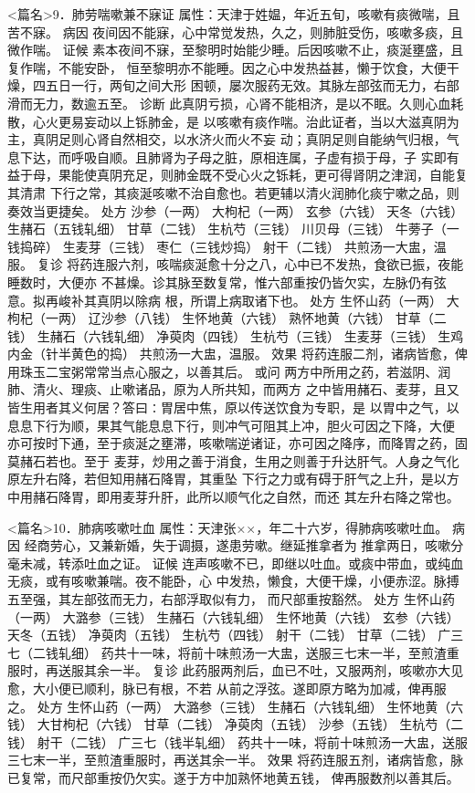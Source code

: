\documentclass[a4paper,12pt,UTF8,twoside]{ctexbook}
\begin{document}
<篇名>9．肺劳喘嗽兼不寐证
属性：天津于姓媪，年近五旬，咳嗽有痰微喘，且苦不寐。 
病因 夜间因不能寐，心中常觉发热，久之，则肺脏受伤，咳嗽多痰，且微作喘。 
证候 素本夜间不寐，至黎明时始能少睡。后因咳嗽不止，痰涎壅盛，且复作喘，不能安卧， 
恒至黎明亦不能睡。因之心中发热益甚，懒于饮食，大便干燥，四五日一行，两旬之间大形 
困顿，屡次服药无效。其脉左部弦而无力，右部滑而无力，数逾五至。 
诊断 此真阴亏损，心肾不能相济，是以不眠。久则心血耗散，心火更易妄动以上铄肺金，是 
以咳嗽有痰作喘。治此证者，当以大滋真阴为主，真阴足则心肾自然相交，以水济火而火不妄 
动；真阴足则自能纳气归根，气息下达，而呼吸自顺。且肺肾为子母之脏，原相连属，子虚有损于母，子 
实即有益于母，果能使真阴充足，则肺金既不受心火之铄耗，更可得肾阴之津润，自能复其清肃 
下行之常，其痰涎咳嗽不治自愈也。若更辅以清火润肺化痰宁嗽之品，则奏效当更捷矣。 
处方 沙参（一两） 大枸杞（一两） 玄参（六钱） 天冬（六钱） 
生赭石（五钱轧细） 甘草（二钱） 生杭芍（三钱） 川贝母（三钱） 牛蒡子（一钱捣碎） 
生麦芽（三钱） 枣仁（三钱炒捣） 射干（二钱） 
共煎汤一大盅，温服。 
复诊 将药连服六剂，咳喘痰涎愈十分之八，心中已不发热，食欲已振，夜能睡数时，大便亦 
不甚燥。诊其脉至数复常，惟六部重按仍皆欠实，左脉仍有弦意。拟再峻补其真阴以除病 
根，所谓上病取诸下也。 
处方 生怀山药（一两） 大枸杞（一两） 辽沙参（八钱） 生怀地黄（六钱） 
熟怀地黄（六钱） 甘草（二钱） 生赭石（六钱轧细） 净萸肉（四钱） 
生杭芍（三钱） 生麦芽（三钱） 生鸡内金（针半黄色的捣） 
共煎汤一大盅，温服。 
效果 将药连服二剂，诸病皆愈，俾用珠玉二宝粥常常当点心服之，以善其后。 
或问 两方中所用之药，若滋阴、润肺、清火、理痰、止嗽诸品，原为人所共知，而两方 
之中皆用赭石、麦芽，且又皆生用者其义何居？答曰∶胃居中焦，原以传送饮食为专职，是 
以胃中之气，以息息下行为顺，果其气能息息下行，则冲气可阻其上冲，胆火可因之下降，大便 
亦可按时下通，至于痰涎之壅滞，咳嗽喘逆诸证，亦可因之降序，而降胃之药，固莫赭石若也。至于 
麦芽，炒用之善于消食，生用之则善于升达肝气。人身之气化原左升右降，若但知用赭石降胃，其重坠 
下行之力或有碍于肝气之上升，是以方中用赭石降胃，即用麦芽升肝，此所以顺气化之自然，而还 
其左升右降之常也。 


<篇名>10．肺病咳嗽吐血
属性：天津张××，年二十六岁，得肺病咳嗽吐血。 
病因 经商劳心，又兼新婚，失于调摄，遂患劳嗽。继延推拿者为 
推拿两日，咳嗽分毫未减，转添吐血之证。 
证候 连声咳嗽不已，即继以吐血。或痰中带血，或纯血无痰，或有咳嗽兼喘。夜不能卧，心 
中发热，懒食，大便干燥，小便赤涩。脉搏五至强，其左部弦而无力，右部浮取似有力， 
而尺部重按豁然。 
处方 生怀山药（一两） 大潞参（三钱） 生赭石（六钱轧细） 生怀地黄（六钱） 
玄参（六钱） 天冬（五钱） 净萸肉（五钱） 生杭芍（四钱） 射干（二钱） 甘草（二钱） 
广三七（二钱轧细） 
药共十一味，将前十味煎汤一大盅，送服三七末一半，至煎渣重服时，再送服其余一半。 
复诊 此药服两剂后，血已不吐，又服两剂，咳嗽亦大见愈，大小便已顺利，脉已有根，不若 
从前之浮弦。遂即原方略为加减，俾再服之。 
处方 生怀山药（一两） 大潞参（三钱） 生赭石（六钱轧细） 生怀地黄（六钱） 
大甘枸杞（六钱） 甘草（二钱） 净萸肉（五钱） 沙参（五钱） 
生杭芍（二钱） 射干（二钱） 广三七（钱半轧细） 
药共十一味，将前十味煎汤一大盅，送服三七末一半，至煎渣重服时，再送其余一半。 
效果 将药连服五剂，诸病皆愈，脉已复常，而尺部重按仍欠实。遂于方中加熟怀地黄五钱， 
俾再服数剂以善其后。 
\end{document}
